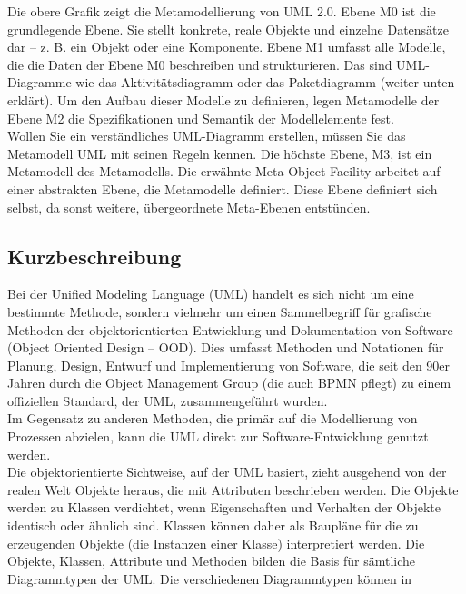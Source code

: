 Die obere Grafik zeigt die Metamodellierung von UML 2.0. Ebene M0 ist die grundlegende Ebene. Sie stellt konkrete, reale Objekte und einzelne Datensätze dar – z. B. ein Objekt oder eine Komponente. Ebene M1 umfasst alle Modelle, die die Daten der Ebene M0 beschreiben und strukturieren. Das sind UML-Diagramme wie das Aktivitätsdiagramm oder das Paketdiagramm (weiter unten erklärt). Um den Aufbau dieser Modelle zu definieren, legen Metamodelle der Ebene M2 die Spezifikationen und Semantik der Modellelemente fest.\\

Wollen Sie ein verständliches UML-Diagramm erstellen, müssen Sie das Metamodell UML mit seinen Regeln kennen. Die höchste Ebene, M3, ist ein Metamodell des Metamodells. Die erwähnte Meta Object Facility arbeitet auf einer abstrakten Ebene, die Metamodelle definiert. Diese Ebene definiert sich selbst, da sonst weitere, übergeordnete Meta-Ebenen entstünden.\\

\subsection{Kurzbeschreibung}
Bei der Unified Modeling Language (UML) handelt es sich nicht um eine bestimmte Methode, sondern vielmehr um einen Sammelbegriff für grafische Methoden der objektorientierten Entwicklung und Dokumentation von Software (Object Oriented Design – OOD). Dies umfasst Methoden und Notationen für Planung, Design, Entwurf und Implementierung von Software, die seit den 90er Jahren durch die Object Management Group (die auch BPMN pflegt) zu einem offiziellen Standard, der UML, zusammengeführt wurden.\\
Im Gegensatz zu anderen Methoden, die primär auf die Modellierung von Prozessen abzielen, kann die UML direkt zur Software-Entwicklung genutzt werden.\\
Die objektorientierte Sichtweise, auf der UML basiert, zieht ausgehend von der realen Welt Objekte heraus, die mit Attributen beschrieben werden. Die Objekte werden zu Klassen verdichtet, wenn Eigenschaften und Verhalten der Objekte identisch oder ähnlich sind. Klassen können daher als Baupläne für die zu erzeugenden Objekte (die Instanzen einer Klasse) interpretiert werden. Die Objekte, Klassen, Attribute und Methoden bilden die Basis für sämtliche Diagrammtypen der UML. Die verschiedenen Diagrammtypen können in\\

